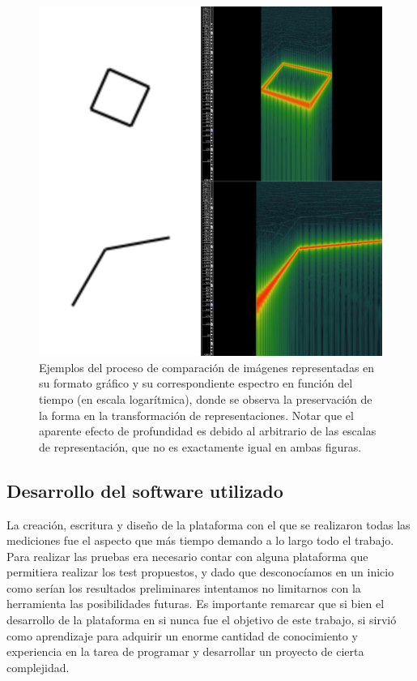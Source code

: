\documentclass{article}
\begin{document}
    \begin{figure}
        \center
        \includegraphics[width=\textwidth]{Imagenes/TranformacionSVG.png}
        \caption{Ejemplos del proceso de comparación de imágenes representadas en su formato gráfico y su correspondiente espectro en función del tiempo (en escala logarítmica), donde se observa la preservación de la forma en la transformación de representaciones. Notar que el aparente efecto de profundidad es debido al arbitrario de las escalas de representación, que no es exactamente igual en ambas figuras.}
        \label{fig:TransformacionSVG}
    \end{figure}

    
\subsection{Desarrollo del software utilizado}

    La creación, escritura y diseño de la plataforma con el que se realizaron todas las mediciones fue el aspecto que más tiempo demando a lo largo todo el trabajo. Para realizar las pruebas era necesario contar con alguna plataforma que permitiera realizar los test propuestos, y dado que desconocíamos en un inicio como serían los resultados preliminares intentamos no limitarnos con la herramienta las posibilidades futuras. Es importante remarcar que si bien el desarrollo de la plataforma en si nunca fue el objetivo de este trabajo, si sirvió como aprendizaje para adquirir un enorme cantidad de conocimiento y experiencia en la tarea de programar y desarrollar un proyecto de cierta complejidad. 
    
\end{document}
